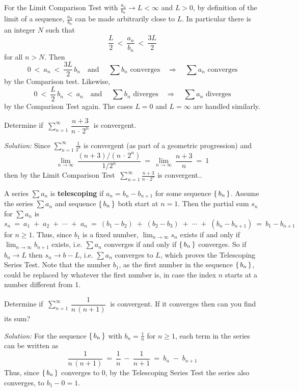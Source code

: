 For the Limit Comparison Test with $\frac{a_n}{b_n} \rightarrow L < \infty$ and
$L > 0$, by definition of the limit of a sequence, $\frac{a_n}{b_n}$ can be made
arbitrarily close to $L$. In particular there is an integer $N$ such that
\[
\frac{L}{2} ~<~ \frac{a_n}{b_n} ~<~ \frac{3L}{2}
\]
for all $n > N$. Then
\[
0 ~<~ a_n ~<~ \frac{3L}{2}\,b_n \quad\text{and $\quad\sum b_n$ converges}
\quad\Rightarrow\quad \text{$\sum a_n$ converges}
\]
by the Comparison test. Likewise,
\[
0 ~<~ \frac{L}{2}\,b_n  ~<~ a_n \quad\text{and $\quad\sum b_n$ diverges}
\quad\Rightarrow\quad \text{$\sum a_n$ diverges}
\]
by the Comparison Test again. The cases $L=0$ and $L=\infty$ are handled
similarly.

\begin{exmp}
\noindent Determine if
$~\displaystyle\sum_{n=1}^{\infty} \,\dfrac{n+3}{n \,\cdot\, 2^n}~$ is
convergent.\vspace{1mm}
\par\noindent\emph{Solution:} Since $\sum_{n=1}^{\infty} \frac{1}{2^n}$ is
convergent (as part of a geometric progression) and
\[
\lim_{n \to \infty} ~\frac{(n+3)/(n \,\cdot\, 2^n)}{1/2^n} ~=~
\lim_{n \to \infty} ~\frac{n+3}{n} ~=~ 1
\]
then by the Limit Comparison Test
$~\sum_{n=1}^{\infty} \frac{n+3}{n \,\cdot\, 2^n}$ is convergent..
\end{exmp}
\divider
\newpage
A series $\sum a_n$ is \textbf{telescoping} if
$a_n = b_n - b_{n+1}$ for some sequence $\left\lbrace\mspace{3mu}b_n\mspace{3mu}\right\rbrace$.
Assume the series $\sum a_n$ and sequence $\left\lbrace\mspace{3mu}b_n\mspace{3mu}\right\rbrace$ both start at $n=1$. Then
the partial sum $s_n$ for $\sum a_n$ is
\[
s_n ~=~ a_1 \;+\; a_2 \;+\; \cdots \;+\; a_n ~=~
(b_1 - b_2) \;+\; (b_2 - b_3) \;+\; \cdots \;+\; (b_n - b_{n+1}) ~=~
b_1 - b_{n+1}
\]
for $n \ge 1$. Thus, since $b_1$ is a fixed number, $\lim_{n \to \infty} s_n$
exists if and only if $\lim_{n \to \infty} b_{n+1}$ exists, i.e. $\sum a_n$
converges if and only if $\left\lbrace\mspace{3mu}b_n\mspace{3mu}\right\rbrace$ converges. So if $b_n \rightarrow L$ then
$s_n \rightarrow b - L$, i.e. $\sum a_n$ converges to $L$, which proves the
Telescoping Series Test. Note that the number $b_1$, as the first number in the
sequence $\left\lbrace\mspace{3mu}b_n\mspace{3mu}\right\rbrace$, could be replaced by whatever the first number is, in case
the index $n$ starts at a number different from 1.

\begin{exmp}\label{exmp:telescoping}
\noindent Determine if
$~\displaystyle\sum_{n=1}^{\infty} \,\dfrac{1}{n\,(n+1)}~$ is
convergent. If it converges then can you find its sum?\vspace{1mm}
\par\noindent\emph{Solution:} For the sequence $\left\lbrace\mspace{3mu}b_n\mspace{3mu}\right\rbrace$ with
$b_n = \frac{1}{n}$ for $n \ge 1$, each term in the series can be written as
\[
\frac{1}{n\,(n+1)} ~=~ \frac{1}{n} ~-~ \frac{1}{n+1} ~=~ b_n \;-\; b_{n+1}
\]
Thus, since $\left\lbrace\mspace{3mu}b_n\mspace{3mu}\right\rbrace$ converges to 0, by the Telescoping Series Test the
series also converges, to $b_1 - 0 = 1$.
\end{exmp}\vspace{-1mm}
\divider
\vspace{2mm}

